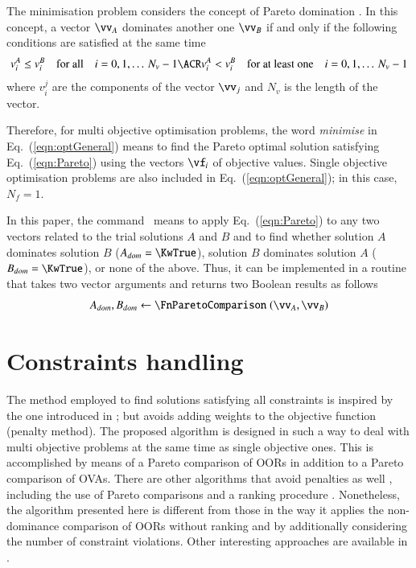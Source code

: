 \documentclass[final,5p,times,twocolumn]{elsarticle}
\newcommand{\eqname}  {Eq.}
\begin{document}
The minimisation problem considers the concept of Pareto domination \citep{fonseca:98a}. In this
concept, a vector $\vv_A$ dominates another one $\vv_B$ if and only if the following conditions are
satisfied at the same time
\begin{align}
    v_i^A \leq v_i^B && \text{for all}          && i=0,1,\ldots\,N_v-1 \ACR
    v_i^A <    v_i^B && \text{for at least one} && i=0,1,\ldots\,N_v-1
\label{eqn:Pareto}
\end{align}
where $v_i^j$ are the components of the vector $\vv_j$ and $N_v$ is the length of the vector.

Therefore, for multi objective optimisation problems, the word \emph{minimise} in
\eqname~(\ref{eqn:optGeneral}) means to find the Pareto optimal solution satisfying
\eqname~(\ref{eqn:Pareto}) using the vectors $\vf_i$ of objective values. Single objective
optimisation problems are also included in \eqname~(\ref{eqn:optGeneral}); in this case, $N_f=1$.

In this paper, the command \FnParetoComparison~means to apply \eqname~(\ref{eqn:Pareto}) to any two
vectors related to the trial solutions $A$ and $B$ and to find whether solution $A$ dominates
solution $B$ (${A_{dom}=\KwTrue}$), solution $B$ dominates solution $A$ (${B_{dom}=\KwTrue}$), or
none of the above. Thus, it can be implemented in a routine that takes two vector arguments and
returns two Boolean results as follows
\begin{equation}
    A_{dom}, B_{dom} \gets \text{\FnParetoComparison}\;(\vv_A,\vv_B)
\end{equation}



\section{Constraints handling}
\label{sec:constraints}

The method employed to find solutions satisfying all constraints is inspired by the one introduced
in \citep{deb:00}; but avoids adding weights to the objective function (penalty method). The
proposed algorithm is designed in such a way to deal with multi objective problems at the same time
as single objective ones. This is accomplished by means of a Pareto comparison of OORs in addition
to a Pareto comparison of OVAs. There are other algorithms that avoid penalties as well
\citep{deb:02}, including the use of Pareto comparisons and a ranking procedure \citep{ray:01,
ray:09}. Nonetheless, the algorithm presented here is different from those in the way it applies the
non-dominance comparison of OORs without ranking and by additionally considering the number of
constraint violations. Other interesting approaches are available in \citep{runarsson:00,
isaacs:08, datta:13}.
\end{document}
